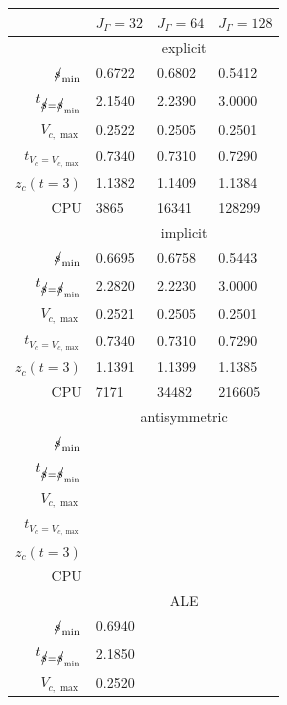 \begin{table}
\center
\hspace*{-3.25cm}
\begin{tabular}{rlll}
\hline
 & $J_\Gamma=32$ & $J_\Gamma=64$ & $J_\Gamma=128$ \\
\hline
& \multicolumn{3}{c}{explicit} \\
\cmidrule{2-4}
$\mbox{$s\!\!\!\!\:/$}_{\min}$                & 0.6722 & 0.6802 & 0.5412 \\
$t_{\strikes = \strikes_{\min}}$ & 2.1540 & 2.2390 & 3.0000 \\
$V_{c,\max}$                     & 0.2522 & 0.2505 & 0.2501 \\
$t_{V_c = V_{c,\max}}$           & 0.7340 & 0.7310 & 0.7290 \\
$z_c(t=3)$                       & 1.1382 & 1.1409 & 1.1384 \\
CPU                              &   3865 &  16341 & 128299 \\
\cmidrule{2-4}
& \multicolumn{3}{c}{implicit} \\
\cmidrule{2-4}
$\mbox{$s\!\!\!\!\:/$}_{\min}$                & 0.6695 & 0.6758 & 0.5443 \\
$t_{\strikes = \strikes_{\min}}$ & 2.2820 & 2.2230 & 3.0000 \\
$V_{c,\max}$                     & 0.2521 & 0.2505 & 0.2501 \\
$t_{V_c = V_{c,\max}}$           & 0.7340 & 0.7310 & 0.7290 \\
$z_c(t=3)$                       & 1.1391 & 1.1399 & 1.1385 \\
CPU                              &   7171 &  34482 & 216605 \\
\cmidrule{2-4}
& \multicolumn{3}{c}{antisymmetric} \\
\cmidrule{2-4}
$\mbox{$s\!\!\!\!\:/$}_{\min}$                & & & \\
$t_{\strikes = \strikes_{\min}}$ & & & \\
$V_{c,\max}$                     & & & \\
$t_{V_c = V_{c,\max}}$           & & & \\
$z_c(t=3)$                       & & & \\
CPU                              & & & \\
\cmidrule{2-4}
& \multicolumn{3}{c}{ALE} \\
\cmidrule{2-4}
$\mbox{$s\!\!\!\!\:/$}_{\min}$                & 0.6940 & & \\
$t_{\strikes = \strikes_{\min}}$ & 2.1850 & & \\
$V_{c,\max}$                     & 0.2520 & & \\

\end{tabular}
\end{table}
